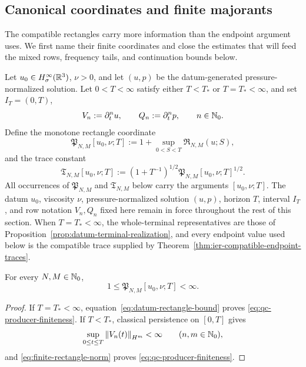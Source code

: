 \subsection{Canonical coordinates and finite majorants}

The compatible rectangles carry more information than the endpoint argument
uses.  We first name their finite coordinates and close the estimates that will
feed the mixed rows, frequency tails, and continuation bounds below.

\begin{definition}
\label{def:qc-producer-constants}
Let \(u_0\in H^\infty_\sigma(\mathbb R^3)\), \(\nu>0\), and let \((u,p)\) be the
datum-generated pressure-normalized solution.  Let \(0<T<\infty\) satisfy
either \(T<T_*\) or \(T=T_*<\infty\), and set
\(I_T=(0,T)\),
\[
 V_n:=\partial_t^n u,
 \qquad
 Q_n:=\partial_t^n p,
 \qquad n\in\mathbb N_0.
\]
Define the monotone rectangle coordinate
\begin{equation}
 \mathfrak P_{N,M}[u_0,\nu;T]
 :=1+\sup_{0<S<T}\mathfrak R_{N,M}(u;S),
 \label{eq:qc-producer-constant}
\end{equation}
and the trace constant
\begin{equation}
 \mathfrak T_{N,M}[u_0,\nu;T]
 :=\left(1+T^{-1}\right)^{1/2}
   \mathfrak P_{N,M}[u_0,\nu;T]^{1/2}.
 \label{eq:qc-trace-constant}
\end{equation}
All occurrences of \(\mathfrak P_{N,M}\) and \(\mathfrak T_{N,M}\) below
carry the arguments \([u_0,\nu;T]\).
The datum \(u_0\), viscosity \(\nu\), pressure-normalized solution
\((u,p)\), horizon \(T\), interval \(I_T\), and row notation \(V_n,Q_n\)
fixed here remain in force throughout the rest of this section.
When \(T=T_*<\infty\), the whole-terminal representatives are those of
Proposition~\ref{prop:datum-terminal-realization}, and every endpoint value
used below is the compatible trace supplied by
Theorem~\ref{thm:ier-compatible-endpoint-traces}.
\end{definition}

\begin{lemma}
\label{lem:qc-producer-finiteness}
For every \(N,M\in\mathbb N_0\),
\begin{equation}
 1\le \mathfrak P_{N,M}[u_0,\nu;T]<\infty.
 \label{eq:qc-producer-finiteness}
\end{equation}
\end{lemma}

\begin{proof}
If \(T=T_*<\infty\), equation~\eqref{eq:datum-rectangle-bound} proves
\eqref{eq:qc-producer-finiteness}.  If \(T<T_*\), classical persistence on
\([0,T]\) gives
\[
 \sup_{0\le t\le T}\left\lVert V_n(t)\right\rVert_{H^m}<\infty
 \qquad(n,m\in\mathbb N_0),
\]
and \eqref{eq:finite-rectangle-norm} proves
\eqref{eq:qc-producer-finiteness}.
\end{proof}


